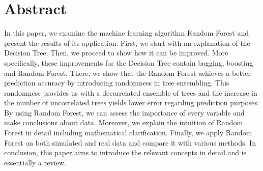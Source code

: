 \section*{Abstract}
\thispagestyle{empty}
In this paper, we examine the machine learning algorithm Random Forest
and present the results of its application.
First, we start with an explanation of the Decision Tree.
Then, we proceed to show how it can be improved.
More specifically, these improvements for the Decision Tree contain bagging, boosting and Random Forest.
There, we show that the Random Forest achieves a better prediction accuracy
by introducing randomness in tree ensembling.
This randomness provides us with a decorrelated ensemble of trees and
the increase in the number of uncorrelated trees yields lower error regarding prediction purposes. By using Random Forest, we can assess the importance of every variable
and make conclusions about data.
Moreover, we explain the intuition of Random Forest in detail including mathematical clarification.
Finally, we apply Random Forest on both simulated and real data and compare it with various methods.
In conclusion, this paper aims to introduce the relevant concepts in detail and is essentially a review. 




